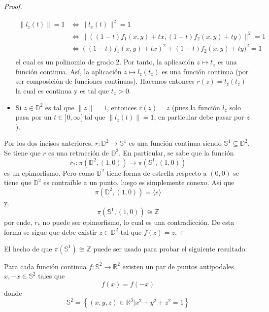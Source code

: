 \documentclass[12pt]{report}
\theoremstyle{largebreak}
\newcommand\cf[3]{\ensuremath{#1:#2\rightarrow#3}}
\begin{document}
\begin{proof}
\begin{itemize}
\begin{equation*}
                \begin{split}
                    \|l_z(t)\|=1&\iff \|l_x(t)\|^2=1\\
                    &\iff\|((1-t)f_1(x,y)+tx,(1-t)f_2(x,y)+ty)\|^2=1\\
                    &\iff((1-t)f_1(x,y)+tx)^2+(1-t)f_2(x,y)+ty)^2=1\\
                \end{split}
            \end{equation*}
            el cual es un polinomio de grado 2. Por tanto, la aplicación $z\mapsto t_z$ es una función continua. Así, la aplicación $z\mapsto l_z(t_z)$ es una función continua (por ser composición de funciones continuas). Hacemos entonces $r(z)=l_z(t_z)$ la cual es continua y es tal que $t_z>0$.
            \item Si $z\in\mathbb{D}^2$ es tal que $\|z\|=1$, entonces $r(z)=z$ (pues la función $l_z$ solo pasa por un $t\in]0,\infty[$ tal que $\|l_z(t)\|=1$, en particular debe pasar por $z$).
        \end{itemize}

        Por los dos incisos anteriores, $\cf{r}{\mathbb{D}^2}{\mathbb{S}^1}$ es una función continua siendo $\mathbb{S}^1\subseteq\mathbb{D}^2$. Se tiene que $r$ es una retracción de $\mathbb{D}^2$. En particular, se sabe que la función
        \begin{equation*}
            \cf{r_*}{\pi(\mathbb{D}^2,(1,0))}{\pi(\mathbb{S}^1,(1,0))}
        \end{equation*}
        es un epimorfismo. Pero como $\mathbb{D}^2$ tiene forma de estrella respecto a $(0,0)$ se tiene que $\mathbb{D}^2$ es contraíble a un punto, luego es simplemente conexo. Así que
        \begin{equation*}
            \pi(\mathbb{D}^2,(1,0))=\langle e\rangle
        \end{equation*}
        y,
        \begin{equation*}
            \pi(\mathbb{S}^1,(1,0))\cong\mathbb{Z}
        \end{equation*}
        por ende, $r_*$ no puede ser epimorfismo, lo cual es una contradicción. De esta forma se sigue que debe existir $z\in\mathbb{D}^2$ tal que $f(z)=z$.
    \end{proof}
    
    El hecho de que $\pi(\mathbb{S}^1)\cong\mathbb{Z}$ puede ser usado para probar el siguiente resultado:

    \begin{theor}
        Para cada función continua $\cf{f}{\mathbb{S}^2}{\mathbb{R}^2}$ existen un par de puntos antipodales $x,-x\in\mathbb{S}^2$ tales que
        \begin{equation*}
            f(x)=f(-x)
        \end{equation*}
        donde
        \begin{equation*}
            \mathbb{S}^2=\left\{(x,y,z)\in\mathbb{R}^3\Big|x^2+y^2+z^2=1\right\}
        \end{equation*}
    \end{theor}
\end{document}

